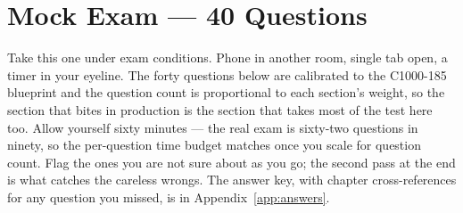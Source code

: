 \chapter{Mock Exam --- 40 Questions}
\label{app:mock}

Take this one under exam conditions. Phone in another room, single tab open, a timer in your eyeline. The forty questions below are calibrated to the C1000-185 blueprint and the question count is proportional to each section's weight, so the section that bites in production is the section that takes most of the test here too. Allow yourself sixty minutes --- the real exam is sixty-two questions in ninety, so the per-question time budget matches once you scale for question count. Flag the ones you are not sure about as you go; the second pass at the end is what catches the careless wrongs. The answer key, with chapter cross-references for any question you missed, is in Appendix~\ref{app:answers}.

